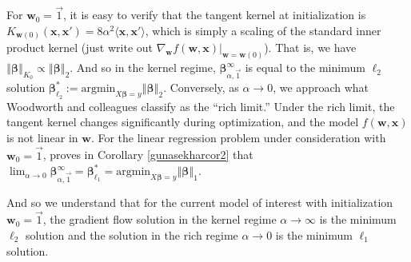 \documentclass{article}
\begin{document}
For $\boldsymbol{w}_0 = \vec{1}$, it is easy to verify that the tangent kernel at initialization is $K_{\boldsymbol{w}(0)}(\boldsymbol{x}, \boldsymbol{x}') = 8 \alpha^2 \langle \boldsymbol{x}, \boldsymbol{x}' \rangle$, which is simply a scaling of the standard inner product kernel (just write out $\nabla_{\boldsymbol{w}} f(\boldsymbol{w}, \boldsymbol{x}) |_{\boldsymbol{w} = \boldsymbol{w}(0)}$).
That is, we have $\left\Vert \boldsymbol{\beta} \right\Vert_{K_0} \propto \left\Vert \boldsymbol{\beta} \right\Vert_2$. And so in the kernel regime, $\boldsymbol{\beta}_{\alpha, \vec{1}}^{\infty}$ is equal to the minimum $\ell_2$ solution $\boldsymbol{\beta}_{\ell_2}^* := \text{argmin}_{X \boldsymbol{\beta} = y} \left\Vert \boldsymbol{\beta} \right\Vert_2$. Conversely, as $\alpha \rightarrow 0$, we approach what Woodworth and colleagues classify as the \enquote{rich limit.} Under the rich limit, the tangent kernel changes significantly during optimization, and the model $f(\boldsymbol{w}, \boldsymbol{x})$ is not linear in $\boldsymbol{w}$. For the linear regression problem under consideration with $\boldsymbol{w}_0 = \vec{1}$, \cite{gunasekar2018implicit} proves in Corollary \ref{gunasekharcor2} that $\lim_{\alpha \rightarrow 0} \boldsymbol{\beta}_{\alpha, \vec{1}}^{\infty} = \boldsymbol{\beta}_{\ell_1}^* = \text{argmin}_{X \boldsymbol{\beta} = y} \left\Vert \boldsymbol{\beta}\right\Vert_1$.

And so we understand that for the current model of interest with initialization $\boldsymbol{w}_0 = \vec{1}$, the gradient flow solution in the kernel regime $\alpha \rightarrow \infty$ is the minimum $\ell_2$ solution and the solution in the rich regime $\alpha \rightarrow 0$ is the minimum $\ell_1$ solution. 
\end{document}
